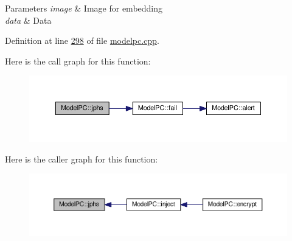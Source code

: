 \begin{DoxyParams}{Parameters}
{\em image} & Image for embedding \\
\hline
{\em data} & Data \\
\hline
\end{DoxyParams}


Definition at line \hyperlink{modelpc_8cpp_source_l00298}{298} of file \hyperlink{modelpc_8cpp_source}{modelpc.\+cpp}.



Here is the call graph for this function\+:
\nopagebreak
\begin{figure}[H]
\begin{center}
\leavevmode
\includegraphics[width=350pt]{class_model_p_c_a8bee0255c09449868c7e6097afaaf0cd_cgraph}
\end{center}
\end{figure}




Here is the caller graph for this function\+:
\nopagebreak
\begin{figure}[H]
\begin{center}
\leavevmode
\includegraphics[width=350pt]{class_model_p_c_a8bee0255c09449868c7e6097afaaf0cd_icgraph}
\end{center}
\end{figure}


